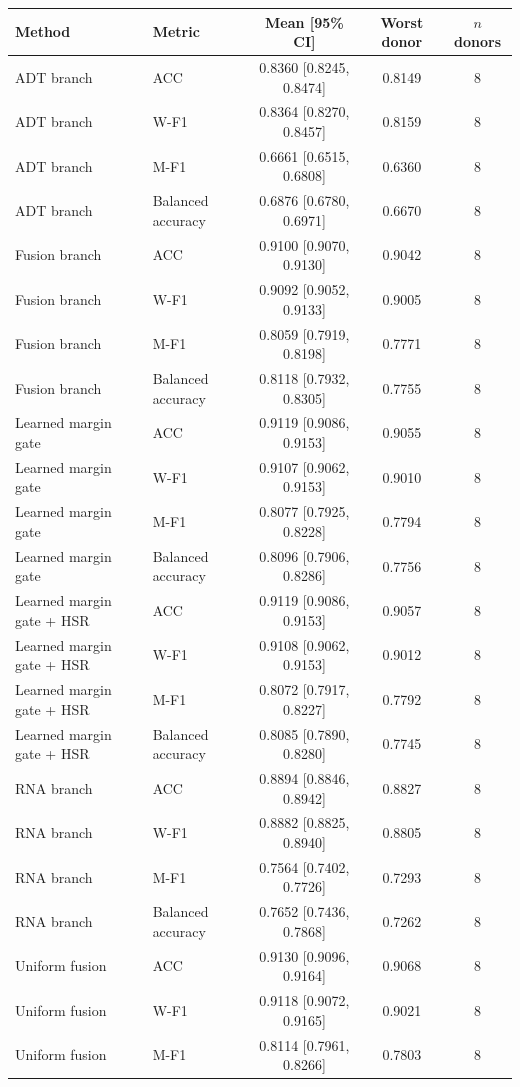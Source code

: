 \begin{tabular}{llccc}
\toprule
Method & Metric & Mean [95\% CI] & Worst donor & $n$ donors \\
\midrule
ADT branch & ACC & 0.8360 [0.8245, 0.8474] & 0.8149 & 8 \\
ADT branch & W-F1 & 0.8364 [0.8270, 0.8457] & 0.8159 & 8 \\
ADT branch & M-F1 & 0.6661 [0.6515, 0.6808] & 0.6360 & 8 \\
ADT branch & Balanced accuracy & 0.6876 [0.6780, 0.6971] & 0.6670 & 8 \\
Fusion branch & ACC & 0.9100 [0.9070, 0.9130] & 0.9042 & 8 \\
Fusion branch & W-F1 & 0.9092 [0.9052, 0.9133] & 0.9005 & 8 \\
Fusion branch & M-F1 & 0.8059 [0.7919, 0.8198] & 0.7771 & 8 \\
Fusion branch & Balanced accuracy & 0.8118 [0.7932, 0.8305] & 0.7755 & 8 \\
Learned margin gate & ACC & 0.9119 [0.9086, 0.9153] & 0.9055 & 8 \\
Learned margin gate & W-F1 & 0.9107 [0.9062, 0.9153] & 0.9010 & 8 \\
Learned margin gate & M-F1 & 0.8077 [0.7925, 0.8228] & 0.7794 & 8 \\
Learned margin gate & Balanced accuracy & 0.8096 [0.7906, 0.8286] & 0.7756 & 8 \\
Learned margin gate + HSR & ACC & 0.9119 [0.9086, 0.9153] & 0.9057 & 8 \\
Learned margin gate + HSR & W-F1 & 0.9108 [0.9062, 0.9153] & 0.9012 & 8 \\
Learned margin gate + HSR & M-F1 & 0.8072 [0.7917, 0.8227] & 0.7792 & 8 \\
Learned margin gate + HSR & Balanced accuracy & 0.8085 [0.7890, 0.8280] & 0.7745 & 8 \\
RNA branch & ACC & 0.8894 [0.8846, 0.8942] & 0.8827 & 8 \\
RNA branch & W-F1 & 0.8882 [0.8825, 0.8940] & 0.8805 & 8 \\
RNA branch & M-F1 & 0.7564 [0.7402, 0.7726] & 0.7293 & 8 \\
RNA branch & Balanced accuracy & 0.7652 [0.7436, 0.7868] & 0.7262 & 8 \\
Uniform fusion & ACC & 0.9130 [0.9096, 0.9164] & 0.9068 & 8 \\
Uniform fusion & W-F1 & 0.9118 [0.9072, 0.9165] & 0.9021 & 8 \\
Uniform fusion & M-F1 & 0.8114 [0.7961, 0.8266] & 0.7803 & 8 \\

\end{tabular}
